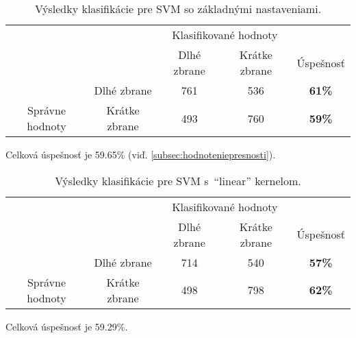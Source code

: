 \begin{table}[H]
    \centering
    \begin{tabular}{ccccc}
                                                                &                                    & \multicolumn{2}{c}{Klasifikované hodnoty}                                                         &                                    \\ \cline{3-5} 
                                                                & \multicolumn{1}{c|}{}              & \multicolumn{1}{c|}{Dlhé zbrane}                & \multicolumn{1}{c|}{Krátke zbrane}              & \multicolumn{1}{c|}{Úspešnosť}     \\ \cline{2-5} 
        \multicolumn{1}{c|}{}                                  & \multicolumn{1}{c|}{Dlhé zbrane}   & \multicolumn{1}{c|}{{\color[HTML]{009901} 761}} & \multicolumn{1}{c|}{{\color[HTML]{9A0000} 536}} & \multicolumn{1}{c|}{\textbf{61\%}} \\ \cline{2-5} 
        \multicolumn{1}{c|}{\multirow{-2}{*}{Správne hodnoty}} & \multicolumn{1}{c|}{Krátke zbrane} & \multicolumn{1}{c|}{{\color[HTML]{9A0000} 493}} & \multicolumn{1}{c|}{{\color[HTML]{009901} 760}} & \multicolumn{1}{c|}{\textbf{59\%}} \\ \cline{2-5} 
    \end{tabular}
    \caption{Výsledky klasifikácie pre SVM so základnými nastaveniami.}
    \label{tab:svmrbf}
\end{table}
Celková úspešnosť je 59.65\% (viď. \ref{subsec:hodnoteniepresnosti}).

\begin{table}[H]
    \centering
    \begin{tabular}{ccccc}
                                                                &                                    & \multicolumn{2}{c}{Klasifikované hodnoty}                                                         &                                    \\ \cline{3-5} 
                                                                & \multicolumn{1}{c|}{}              & \multicolumn{1}{c|}{Dlhé zbrane}                & \multicolumn{1}{c|}{Krátke zbrane}              & \multicolumn{1}{c|}{Úspešnosť}     \\ \cline{2-5} 
        \multicolumn{1}{c|}{}                                  & \multicolumn{1}{c|}{Dlhé zbrane}   & \multicolumn{1}{c|}{{\color[HTML]{009901} 714}} & \multicolumn{1}{c|}{{\color[HTML]{9A0000} 540}} & \multicolumn{1}{c|}{\textbf{57\%}} \\ \cline{2-5} 
        \multicolumn{1}{c|}{\multirow{-2}{*}{Správne hodnoty}} & \multicolumn{1}{c|}{Krátke zbrane} & \multicolumn{1}{c|}{{\color[HTML]{9A0000} 498}} & \multicolumn{1}{c|}{{\color[HTML]{009901} 798}} & \multicolumn{1}{c|}{\textbf{62\%}} \\ \cline{2-5} 
    \end{tabular}
    \caption{Výsledky klasifikácie pre SVM s~``linear'' kernelom.}
    \label{tab:svmlinear}
\end{table}
Celková úspešnosť je 59.29\%.

